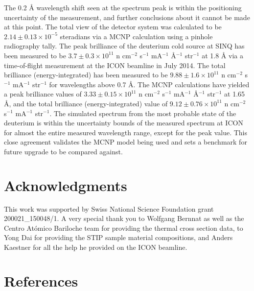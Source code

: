 \documentclass[5p,12pt]{elsarticle}
\begin{document}
The 0.2 {\AA} wavelength shift seen at the spectrum peak is within the positioning uncertainty of the measurement, and further conclusions about it cannot be made at this point.  The total view of the detector system was calculated to be $2.14 \pm 0.13\times10^{-5}$ steradians via a MCNP calculation using a pinhole radiography tally.  The peak brilliance of the deuterium cold source at SINQ has been measured to be $3.7 \pm 0.3\times10^{11}$ n cm$^{-2}$ s$^{-1}$ mA$^{-1}$ \AA$^{-1}$ str$^{-1}$ at 1.8 {\AA} via a time-of-flight measurement at the ICON beamline in July 2014.  The total brilliance (energy-integrated) has been measured to be  $9.88 \pm 1.6\times10^{11}$  n cm$^{-2}$ s$^{-1}$ mA$^{-1}$ str$^{-1}$ for wavelengths above 0.7 {\AA}.  The MCNP calculations have yielded a peak brilliance values of $3.33 \pm 0.15\times10^{11}$ n cm$^{-2}$ s$^{-1}$ mA$^{-1}$ \AA$^{-1}$ str$^{-1}$ at 1.65 {\AA}, and the total brilliance (energy-integrated) value of $9.12 \pm 0.76\times10^{11}$ n cm$^{-2}$ s$^{-1}$ mA$^{-1}$ str$^{-1}$.  The simulated spectrum from the most probable state of the deuterium is within the uncertainty bounds of the measured spectrum at ICON for almost the entire measured wavelength range, except for the peak value.  This close agreement validates the MCNP model being used and sets a benchmark for future upgrade to be compared against.  

%
%
%
%
%

\section*{Acknowledgments}
\label{sec:ack}

This work was supported by Swiss National Science Foundation grant 200021\_150048/1.  A very special thank you to Wolfgang Bernnat as well as the Centro At\'{o}mico Bariloche team for providing the thermal cross section data, to Yong Dai for providing the STIP sample material compositions, and Anders Kaestner for all the help he provided on the ICON beamline.

%
%
%
%
%

\section*{References}


\end{document}
